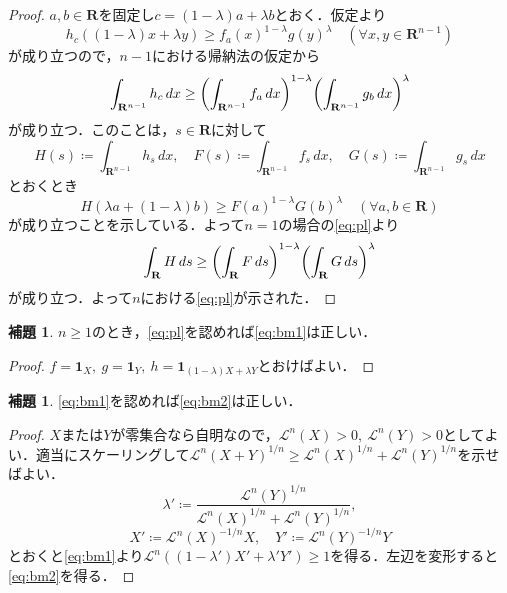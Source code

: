 \documentclass[a4j]{ltjsarticle}
\newcommand{\Rset}{\mathbf{R}}
\newcommand{\Lm}{\mathcal{L}}
\newcommand{\1}{\bm{1}}
\numberwithin{equation}{section}
\theoremstyle{definition}
\newtheorem{lem}[thm]{補題}
\begin{document}
\begin{proof}
    $a,b\in\Rset$を固定し$c=(1-\lambda)a+\lambda b$とおく．仮定より
    \begin{equation}
        h_c((1-\lambda)x+\lambda y)\geq f_a(x)^{1-\lambda}g(y)^{\lambda}\quad (\forall x,y\in\Rset^{n-1})
    \end{equation}
    が成り立つので，$n-1$における帰納法の仮定から
    \begin{equation}
        \int_{\Rset^{n-1}}h_c\,dx\geq \qty(\int_{\Rset^{n-1}}f_a\,dx)^{1-\lambda}\qty(\int_{\Rset^{n-1}}g_b\,dx)^{\lambda}
    \end{equation}
    が成り立つ．このことは，$s\in\Rset$に対して
    \begin{equation}
        H(s)\coloneqq \int_{\Rset^{n-1}}h_s\,dx,\quad F(s)\coloneqq \int_{\Rset^{n-1}}f_s\,dx,\quad G(s)\coloneqq \int_{\Rset^{n-1}}g_s\,dx
    \end{equation}
    とおくとき
    \begin{equation}
        H(\lambda a+(1-\lambda)b)\geq F(a)^{1-\lambda}G(b)^{\lambda}\quad (\forall a,b\in\Rset)
    \end{equation}
    が成り立つことを示している．よって$n=1$の場合の\eqref{eq:pl}より
    \begin{equation}
        \int_{\Rset}H\,ds\geq \qty(\int_{\Rset}F\,ds)^{1-\lambda}\qty(\int_{\Rset}G\,ds)^{\lambda}
    \end{equation}
    が成り立つ．よって$n$における\eqref{eq:pl}が示された．
\end{proof}
\begin{lem}\label{lem:pl_implies_bm1}
    $n\geq 1$のとき，\eqref{eq:pl}を認めれば\eqref{eq:bm1}は正しい．
\end{lem}
\begin{proof}
    $f=\1_{X},\ g=\1_{Y},\ h=\1_{(1-\lambda)X+\lambda Y}$とおけばよい．
\end{proof}
\begin{lem}\label{lem:bm1_implies_bm2}
    \eqref{eq:bm1}を認めれば\eqref{eq:bm2}は正しい．
\end{lem}
\begin{proof}
    $X$または$Y$が零集合なら自明なので，$\Lm^n(X)>0,\ \Lm^n(Y)>0$としてよい．適当にスケーリングして$\Lm^n(X+Y)^{1/n}\geq \Lm^n(X)^{1/n}+\Lm^n(Y)^{1/n}$を示せばよい．
    \begin{equation}
        \lambda'\coloneqq \frac{\Lm^n(Y)^{1/n}}{\Lm^n(X)^{1/n}+\Lm^n(Y)^{1/n}},
    \end{equation}
    \begin{equation}
        X'\coloneqq \Lm^n(X)^{-1/n}X,\quad Y'\coloneqq \Lm^n(Y)^{-1/n}Y
    \end{equation}
    とおくと\eqref{eq:bm1}より$\Lm^n((1-\lambda')X'+\lambda'Y')\geq1$を得る．左辺を変形すると\eqref{eq:bm2}を得る．
\end{proof}
\end{document}
